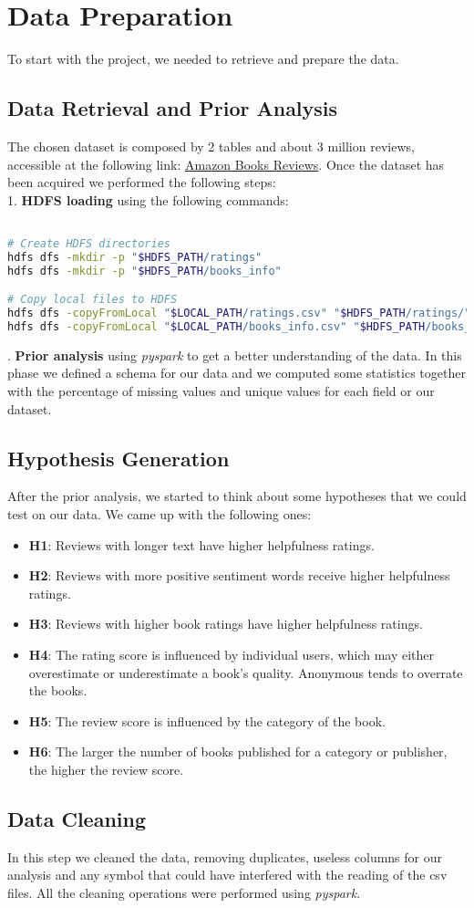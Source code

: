 \section{Data Preparation}
To start with the project, we needed to retrieve and prepare the data.

\subsection*{Data Retrieval and Prior Analysis}
The chosen dataset is composed by 2 tables and about 3 million reviews, accessible at the following link:
\href{https://www.kaggle.com/datasets/mohamedbakhet/amazon-books-reviews}{Amazon Books Reviews}.
Once the dataset has been acquired we performed the following steps:\\
1. \textbf{HDFS loading} using the following commands:
\lstset{
    basicstyle=\ttfamily,
    frame=single,
    breaklines=true
}
\begin{lstlisting}[language=bash]

# Create HDFS directories
hdfs dfs -mkdir -p "$HDFS_PATH/ratings"
hdfs dfs -mkdir -p "$HDFS_PATH/books_info"

# Copy local files to HDFS
hdfs dfs -copyFromLocal "$LOCAL_PATH/ratings.csv" "$HDFS_PATH/ratings/"
hdfs dfs -copyFromLocal "$LOCAL_PATH/books_info.csv" "$HDFS_PATH/books_info/"
\end{lstlisting}

. \textbf{Prior analysis} using \textit{pyspark} to get a better understanding of the data. In this phase
we defined a schema for our data and we computed some statistics together with the percentage of missing values and
unique values for each field or our dataset.

\subsection*{Hypothesis Generation}
After the prior analysis, we started to think about some hypotheses that we could test on our data. We came up with
the following ones:

\begin{itemize}[leftmargin=*, noitemsep]
    \item \textbf{H1}: Reviews with longer text have higher helpfulness ratings.
    \item \textbf{H2}: Reviews with more positive sentiment words receive higher helpfulness ratings.
    \item \textbf{H3}: Reviews with higher book ratings have higher helpfulness ratings.
    \item \textbf{H4}: The rating score is influenced by individual users, which may either overestimate or underestimate a book's quality. Anonymous tends to overrate the books.
    \item \textbf{H5}: The review score is influenced by the category of the book.
    \item \textbf{H6}: The larger the number of books published for a category or publisher, the higher the review score.
\end{itemize}

\subsection*{Data Cleaning}
In this step we cleaned the data, removing duplicates, useless columns for our analysis and any symbol that could
have interfered with the reading of the csv files. All the cleaning operations were performed using \textit{pyspark}.
